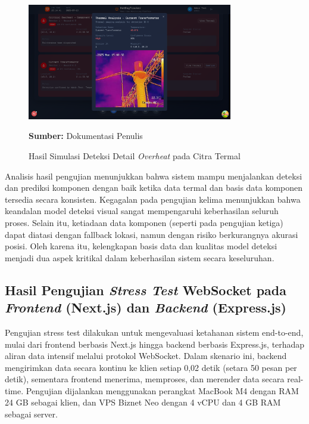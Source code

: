     \begin{figure}[H]
        \centering
        \includegraphics[width=0.8\textwidth]{gambar/bab4/webview.png}
        \caption{Hasil Simulasi Deteksi Detail \emph{Overheat} pada Citra Termal}
        \label{fig:simulasi_overheat_detail}
        \footnotesize{\textbf{Sumber:} Dokumentasi Penulis}
        \end{figure}
    

    Analisis hasil pengujian menunjukkan bahwa sistem mampu menjalankan deteksi dan prediksi komponen dengan baik ketika data termal dan basis data komponen tersedia secara konsisten. Kegagalan pada pengujian kelima menunjukkan bahwa keandalan model deteksi visual sangat mempengaruhi keberhasilan seluruh proses. Selain itu, ketiadaan data komponen (seperti pada pengujian ketiga) dapat diatasi dengan fallback lokasi, namun dengan risiko berkurangnya akurasi posisi. Oleh karena itu, kelengkapan basis data dan kualitas model deteksi menjadi dua aspek kritikal dalam keberhasilan sistem secara keseluruhan.


    \subsection{Hasil Pengujian \textit{Stress Test} WebSocket pada \textit{Frontend} (Next.js) dan \textit{Backend} (Express.js)}

    Pengujian stress test dilakukan untuk mengevaluasi ketahanan sistem end-to-end, mulai dari frontend berbasis Next.js hingga backend berbasis Express.js, terhadap aliran data intensif melalui protokol WebSocket. Dalam skenario ini, backend mengirimkan data secara kontinu ke klien setiap 0,02 detik (setara 50 pesan per detik), sementara frontend menerima, memproses, dan merender data secara real-time. Pengujian dijalankan menggunakan perangkat MacBook M4 dengan RAM 24 GB sebagai klien, dan VPS Biznet Neo dengan 4 vCPU dan 4 GB RAM sebagai server.
    
